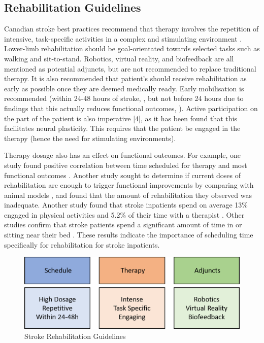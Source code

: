 \documentclass[12pt]{report}
\begin{document}
\subsection{Rehabilitation Guidelines}

Canadian stroke best practices recommend that therapy involves the repetition of intensive, task-specific activities in a complex and stimulating environment \cite{Hebert2016}. Lower-limb rehabilitation should be goal-orientated towards selected tasks such as walking and sit-to-stand. Robotics, virtual reality, and biofeedback are all mentioned as potential adjuncts, but are not recommended to replace traditional therapy. It is also recommended that patient's should receive rehabilitation as early as possible once they are deemed medically ready. Early mobilisation is recommended (within 24-48 hours of stroke, \cite{Casaubon2016}, but not before 24 hours due to findings that this actually reduces functional outcomes, \cite{AVERTTrialCollaborationgroup2015}). Active participation on the part of the patient is also imperative [4], as it has been found that this facilitates neural plasticity. This requires that the patient be engaged in the therapy (hence the need for stimulating environments).

Therapy dosage also has an effect on functional outcomes. For example, one study found positive correlation between time scheduled for therapy and most functional outcomes \cite{Lohse2014}. Another study sought to determine if current doses of rehabilitation are enough to trigger functional improvements by comparing with animal models \cite{Lang2009}, and found that the amount of rehabilitation they observed was inadequate. Another study found that stroke inpatients spend on average 13\% engaged in physical activities and 5.2\% of their time with a therapist \cite{Bernhardt2004}. Other studies confirm that stroke patients spend a significant amount of time in or sitting near their bed \cite{King2011}. These results indicate the importance of scheduling time specifically for rehabilitation for stroke inpatients. 

	\begin{figure}[h] 
		\centering
		\includegraphics[width=0.75\linewidth]{guidelines}
		\caption{Stroke Rehabilitation Guidelines}
		\label{fig:guidelines}
	\end{figure}
\end{document}
